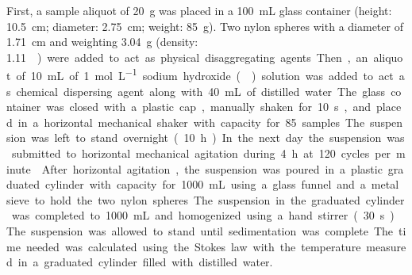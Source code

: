 First, a sample aliquot of \SI{20}{\gram} was placed in a \SI{100}{\milli\liter} glass container 
(height: \SI{10.5}{\centi\metre}; diameter: \SI{2.75}{\centi\metre}; weight: \SI{85}{\gram}). Two nylon
spheres with a diameter of \SI{1.71}{\centi\metre} and weighting \SI{3.04}{\gram} (density: 
\SI{1.11}{\gram\per\centi\metre\cubic}) were added to act as physical disaggregating agents. Then, an 
aliquot of \SI{10}{\milli\liter} of \SI{1}{\mole\per\liter} sodium hydroxide () solution was 
added to act as chemical dispersing agent along with \SI{40}{\milli\liter} of distilled water. The glass 
container was closed with a plastic cap, manually shaken for \SI{10}{\second}, and placed in a horizontal
mechanical shaker with capacity for \num{85}~samples. The suspension was left to stand overnight 
(\SI{10}{\hour}). In the next day the suspension was submitted to horizontal mechanical agitation during 
\SI{4}{\hour} at \si{120} cycles per minute \cite{SuzukiEtAl2004,SuzukiEtAl2004a}.

After horizontal agitation, the suspension was poured in a plastic graduated cylinder with capacity for 
\SI{1000}{\milli\liter} using a glass funnel and a metal sieve to hold the two nylon spheres. The 
suspension in the graduated cylinder was completed to \SI{1000}{\milli\liter} and homogenized using a
hand stirrer (\SI{30}{\second}). The suspension was allowed to stand until sedimentation was complete. 
The time needed was calculated using the Stokes law with the temperature measured in a graduated cylinder 
filled with distilled water.


